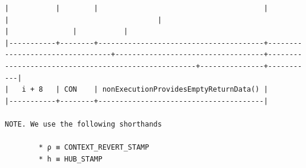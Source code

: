\documentclass[varwidth=\maxdimen,margin=0.5cm,multi={verbatim}]{standalone}
\begin{document}
\begin{verbatim}
|           |        |                                       |                                 |                                   |                                                     |               |           |
|-----------+--------+---------------------------------------+---------------------------------+-----------------------------------+-----------------------------------------------------+---------------+-----------|
|   i + 8   | CON    | nonExecutionProvidesEmptyReturnData() |
|-----------+--------+---------------------------------------|

NOTE. We use the following shorthands

        * ρ ≡ CONTEXT_REVERT_STAMP
        * h ≡ HUB_STAMP

\end{verbatim}
\end{document}
